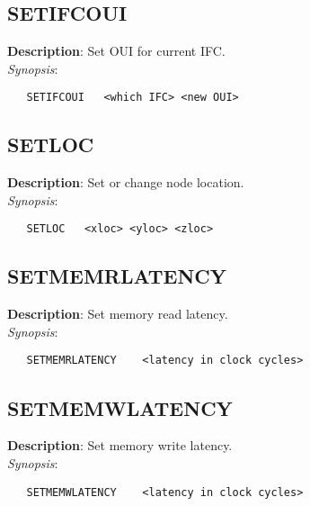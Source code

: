 \subsection{\bf SETIFCOUI}
\label{manpages:SETIFCOUI}
\label{manpages:setifcoui}
\vspace{-0.2in}
{\bf Description}: 	Set OUI for current IFC.\\[1.5ex]
{\em Synopsis}:
\vspace{-0.2in}
\scriptsize
\begin{verbatim}
   SETIFCOUI   <which IFC> <new OUI>				
\end{verbatim}
\normalsize
\vspace{-0.2in}


\subsection{\bf SETLOC}
\label{manpages:SETLOC}
\label{manpages:setloc}
\vspace{-0.2in}
{\bf Description}: 	Set or change node location.\\[1.5ex]
{\em Synopsis}:
\vspace{-0.2in}
\scriptsize
\begin{verbatim}
   SETLOC   <xloc> <yloc> <zloc>	
\end{verbatim}
\normalsize
\vspace{-0.2in}


\subsection{\bf SETMEMRLATENCY}
\label{manpages:SETMEMRLATENCY}
\label{manpages:setmemrlatency}
\vspace{-0.2in}
{\bf Description}: 	Set memory read latency.\\[1.5ex]
{\em Synopsis}:
\vspace{-0.2in}
\scriptsize
\begin{verbatim}
   SETMEMRLATENCY    <latency in clock cycles>	
\end{verbatim}
\normalsize
\vspace{-0.2in}


\subsection{\bf SETMEMWLATENCY}
\label{manpages:SETMEMWLATENCY}
\label{manpages:setmemwlatency}
\vspace{-0.2in}
{\bf Description}: 	Set memory write latency.\\[1.5ex]
{\em Synopsis}:
\vspace{-0.2in}
\scriptsize
\begin{verbatim}
   SETMEMWLATENCY    <latency in clock cycles>	
\end{verbatim}
\normalsize
\vspace{-0.2in}


